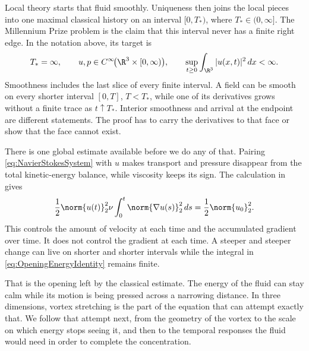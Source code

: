 Local theory starts that fluid smoothly.  Uniqueness then joins the local
pieces into one maximal classical history on an interval \([0,T_*)\), where
\(T_*\in(0,\infty]\).  The Millennium Prize problem is the claim that this
interval never has a finite right edge.  In the notation above, its target is
\begin{equation}\label{eq:WholeSpaceRegularityTarget}
  T_*=\infty,
  \qquad
  u,p\in C^\infty\!\bigl(\R^3\times[0,\infty)\bigr),
  \qquad
  \sup_{t\geq0}\int_{\R^3}|u(x,t)|^2\,dx<\infty.
\end{equation}
Smoothness includes the last slice of every finite interval.  A field can be
smooth on every shorter interval \([0,T]\), \(T<T_*\), while one of its
derivatives grows without a finite trace as \(t\uparrow T_*\).  Interior
smoothness and arrival at the endpoint are different statements.  The proof
has to carry the derivatives to that face or show that the face cannot exist.

There is one global estimate available before we do any of that.  Pairing
\eqref{eq:NavierStokesSystem} with \(u\) makes transport and pressure disappear
from the total kinetic-energy balance, while viscosity keeps its sign.  The
calculation in  gives
\begin{equation}\label{eq:OpeningEnergyIdentity}
  \frac12\norm{u(t)}_2^2
  \nu\int_0^t\norm{\nabla u(s)}_2^2\,ds
  =\frac12\norm{u_0}_2^2.
\end{equation}
This controls the amount of velocity at each time and the accumulated gradient
over time.  It does not control the gradient at each time.  A steeper and
steeper change can live on shorter and shorter intervals while the integral in
\eqref{eq:OpeningEnergyIdentity} remains finite.

That is the opening left by the classical estimate.  The energy of the fluid
can stay calm while its motion is being pressed across a narrowing distance.
In three dimensions, vortex stretching is the part of the equation that can
attempt exactly that.  We follow that attempt next, from the geometry of the
vortex to the scale on which energy stops seeing it, and then to the temporal
responses the fluid would need in order to complete the concentration.
